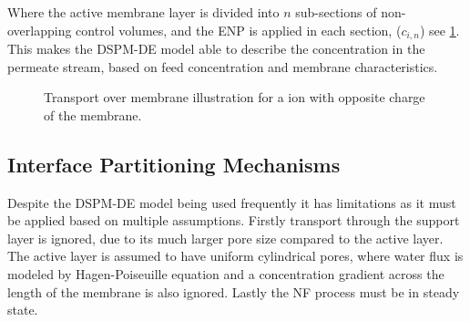 Where the active membrane layer is divided into $n$ sub-sections of non-overlapping control volumes, %
and the ENP is applied in each section, ($c_{i,n}$) see \cref{fig:NF_illustration_transport}. 
\citep{NanoFiltran_computer_2008} \citep{MIT_2018_DSPM_DE_Fabrication} 
This makes the DSPM-DE model able to describe the concentration in the permeate stream, based on feed concentration and membrane characteristics. \citep{wangPoreModelNanofiltration2021}



\begin{figure}[H]
    \centering
    
    \caption{Transport over membrane illustration for a ion with opposite charge of the membrane. }
    \label{fig:NF_illustration_transport}
\end{figure}


\subsection{Interface Partitioning Mechanisms}
Despite the DSPM-DE model being used frequently it has limitations as it must be applied based on multiple assumptions.  
Firstly transport through the support layer is ignored, due to its much larger pore size compared to the active layer. 
The active layer is assumed to have uniform cylindrical pores, where water flux is modeled by Hagen-Poiseuille equation and a concentration gradient across the length of the membrane is also ignored. 
Lastly the NF process must be in steady state.  \citep{wangPoreModelNanofiltration2021}


